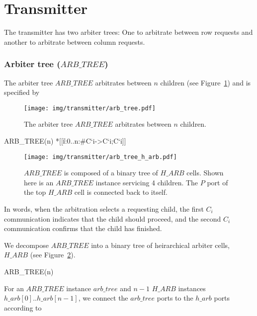 \documentclass{article}
\begin{document}
\part{Transmitter}
The transmitter has two arbiter trees: One to arbitrate between row requests and another to arbitrate between column requests. 

\section{Arbiter tree ($ARB\_TREE$)}

The arbiter tree $ARB\_TREE$ arbitrates between $n$ children (see Figure~\ref{fig:arb_tree}) and is specified by

\begin{figure}
  \centering
  \texttt{[image: img/transmitter/arb\_tree.pdf]}
  \caption{The arbiter tree $ARB\_TREE$ arbitrates between $n$ children.}
  \label{fig:arb_tree}
\end{figure}

\begin{csp}
ARB_TREE(n)\equiv
  *[[\langle\|i:0..n:#{C`i}->C`i;C`i\rangle]]
\end{csp}

\begin{figure}
  \centering
  \texttt{[image: img/transmitter/arb\_tree\_h\_arb.pdf]}
  \caption{$ARB\_TREE$ is composed of a binary tree of $H\!\_ARB$ cells. Shown here is an $ARB\_TREE$ instance servicing 4 children. The $P$ port of the top $H\!\_ARB$ cell is connected back to itself.}
  \label{fig:arb_tree_h_arb}
\end{figure}

In words, when the arbitration selects a requesting child, the first $C_i$ communication indicates that the child should proceed, and the second $C_i$ communication confirms that the child has finished.

We decompose $ARB\_TREE$ into a binary tree of heirarchical arbiter cells, $H\!\_ARB$ (see Figure~\ref{fig:arb_tree_h_arb}). 

\begin{csp}
ARB_TREE(n)
\end{csp}

\noindent For an $ARB\_TREE$ instance $arb\_tree$ and $n-1$ $H\_ARB$ instances $h\_arb[0]..h\_arb[n-1]$, we connect the $arb\_tree$ ports to the $h\_arb$ ports according to
\end{document}
